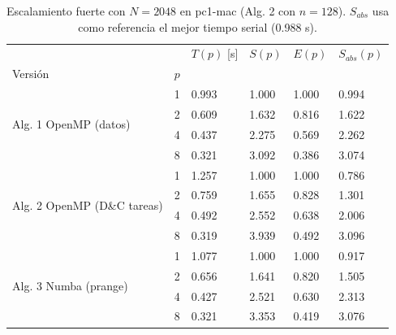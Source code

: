 \begin{table}[H]
\centering\small
\caption{Escalamiento fuerte con $N=2048$ en pc1-mac (Alg. 2 con $n=128$). $S_{abs}$ usa como referencia el mejor tiempo serial (0.988 s).}
\label{tab:bcd_escalamiento_pc1-mac}
\begin{tabular}{llllll}
\toprule
 &  & $T(p)$ [s] & $S(p)$ & $E(p)$ & $S_{abs}(p)$ \\
Versión & $p$ &  &  &  &  \\
\midrule
\multirow[t]{4}{*}{Alg. 1 OpenMP (datos)} & 1 & 0.993 & 1.000 & 1.000 & 0.994 \\
 & 2 & 0.609 & 1.632 & 0.816 & 1.622 \\
 & 4 & 0.437 & 2.275 & 0.569 & 2.262 \\
 & 8 & 0.321 & 3.092 & 0.386 & 3.074 \\
\cline{1-6}
\multirow[t]{4}{*}{Alg. 2 OpenMP (D\&C tareas)} & 1 & 1.257 & 1.000 & 1.000 & 0.786 \\
 & 2 & 0.759 & 1.655 & 0.828 & 1.301 \\
 & 4 & 0.492 & 2.552 & 0.638 & 2.006 \\
 & 8 & 0.319 & 3.939 & 0.492 & 3.096 \\
\cline{1-6}
\multirow[t]{4}{*}{Alg. 3 Numba (prange)} & 1 & 1.077 & 1.000 & 1.000 & 0.917 \\
 & 2 & 0.656 & 1.641 & 0.820 & 1.505 \\
 & 4 & 0.427 & 2.521 & 0.630 & 2.313 \\
 & 8 & 0.321 & 3.353 & 0.419 & 3.076 \\
\cline{1-6}
\bottomrule
\end{tabular}
\end{table}
